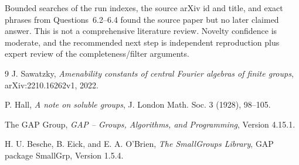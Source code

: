 \documentclass[11pt]{article}
\begin{document}
Bounded searches of the run indexes, the source arXiv id and title, and exact
phrases from Questions~6.2--6.4 found the source paper but no later claimed
answer.  This is not a comprehensive literature review.  Novelty confidence
is moderate, and the recommended next step is independent reproduction plus
expert review of the completeness/filter arguments.

\begin{thebibliography}{9}
J. Sawatzky, \emph{Amenability constants of central Fourier algebras of finite
groups}, arXiv:2210.16262v1, 2022.

P. Hall, \emph{A note on soluble groups}, J. London Math. Soc. 3 (1928),
98--105.

The GAP Group, \emph{GAP -- Groups, Algorithms, and Programming},
Version 4.15.1.

H. U. Besche, B. Eick, and E. A. O'Brien, \emph{The SmallGroups Library},
GAP package SmallGrp, Version 1.5.4.
\end{thebibliography}
\end{document}
